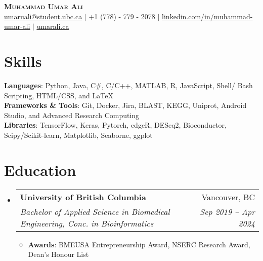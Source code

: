 \documentclass[letterpaper,11pt]{article}
\makeatletter
\newcommand{\resumeItem}[1]{
  \item\small{
    {#1 \vspace{-2pt}}
  }
}
\newcommand{\resumeSubheading}[4]{
  \vspace{-2pt}\item
    \begin{tabular*}{0.97\textwidth}[t]{l@{\extracolsep{\fill}}r}
      \textbf{#1} & #2 \\
      \textit{\small#3} & \textit{\small #4} \\
    \end{tabular*}\vspace{-7pt}
}
\newcommand{\resumeSubHeadingListStart}{\begin{itemize}[leftmargin=0.15in, label={}]}
\newcommand{\resumeSubHeadingListEnd}{\end{itemize}\vspace{-0.5cm}}
\newcommand{\resumeItemListStart}{\begin{itemize}[leftmargin=*]}
\newcommand{\resumeItemListEnd}{\end{itemize}\vspace{-5pt}}
\newcommand\bbold[1]{\textcolor{primay}{\textbf{#1}}}
\newcommand\bunderline[1]{\textcolor{primay}{\underline{#1}}}
\makeatother
\begin{document}

\begin{center}
    \bbold{\LARGE \scshape Muhammad Umar Ali} \\ \vspace{1pt}
    \href{mailto:umaruali@student.ubc.ca}{\bunderline{umaruali@student.ubc.ca}} $|$ \small +1 (778) - 779 - 2078 $|$ 
    \href{https://www.linkedin.com/in/muhammad-umar-ali/}{\bunderline{linkedin.com/in/muhammad-umar-ali}} $|$
    \href{https://umarali.ca/}{\bunderline{umarali.ca}}
\end{center}

\vspace{-0.75cm}

\section{Skills}


 \begin{itemize}[leftmargin=0.15in, label={}]
    \small{\item{
     \textbf{Languages}{: Python, Java, C\#, C/C++, MATLAB, R, JavaScript, Shell/ Bash Scripting, HTML/CSS, and \LaTeX} \\
     \textbf{Frameworks \& Tools}{: Git, Docker, Jira, BLAST, KEGG, Uniprot, Android Studio, and Advanced Research Computing} \\
     \textbf{Libraries}{: TensorFlow, Keras, Pytorch, edgeR, DESeq2, Bioconductor, Scipy/Scikit-learn, Matplotlib, Seaborne, ggplot} %
    }}
 \end{itemize}
\vspace{-0.75cm}

\section{Education}
  \resumeSubHeadingListStart
    \resumeSubheading
      {University of British Columbia}{Vancouver, BC}
      {Bachelor of Applied Science in Biomedical Engineering, Conc. in Bioinformatics}{Sep 2019 -- Apr 2024}
        \resumeItemListStart
        \resumeItem{\textbf{Awards}: BMEUSA Entrepreneurship Award, NSERC Research Award, Dean's Honour List}
      \resumeItemListEnd
  \resumeSubHeadingListEnd
\end{document}
